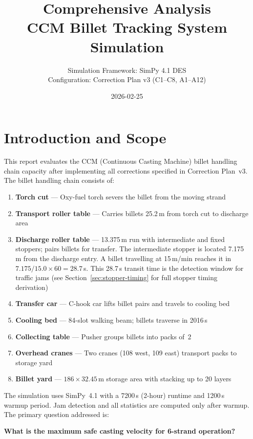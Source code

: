 \documentclass[11pt,a4paper]{article}
\title{\textbf{Comprehensive Analysis} \\ CCM Billet Tracking System Simulation}
\author{Simulation Framework: SimPy 4.1 DES \\ Configuration: Correction Plan v3 (C1--C8, A1--A12)}
\date{2026-02-25}
\begin{document}
\maketitle
\tableofcontents
\newpage

\section{Introduction and Scope}
\label{sec:introduction}

This report evaluates the CCM (Continuous Casting Machine) billet handling chain capacity after implementing all corrections specified in Correction Plan~v3. The billet handling chain consists of:

\begin{enumerate}
    \item \textbf{Torch cut} --- Oxy-fuel torch severs the billet from the moving strand
    \item \textbf{Transport roller table} --- Carries billets 25.2\,m from torch cut to discharge area
    \item \textbf{Discharge roller table} --- 13.375\,m run with intermediate and fixed stoppers; pairs billets for transfer. The intermediate stopper is located 7.175\,m from the discharge entry. A billet travelling at 15\,m/min reaches it in $7.175 / 15.0 \times 60 = 28.7$\,s. This 28.7\,s transit time is the detection window for traffic jams (see Section~\ref{sec:stopper-timing} for full stopper timing derivation)
    \item \textbf{Transfer car} --- C-hook car lifts billet pairs and travels to cooling bed
    \item \textbf{Cooling bed} --- 84-slot walking beam; billets traverse in 2016\,s
    \item \textbf{Collecting table} --- Pusher groups billets into packs of~2
    \item \textbf{Overhead cranes} --- Two cranes (108 west, 109 east) transport packs to storage yard
    \item \textbf{Billet yard} --- $186 \times 32.45$\,m storage area with stacking up to 20 layers
\end{enumerate}

The simulation uses SimPy~4.1 with a 7200\,s (2-hour) runtime and 1200\,s warmup period. Jam detection and all statistics are computed only after warmup. The primary question addressed is:

\begin{center}
\textbf{What is the maximum safe casting velocity for 6-strand operation?}
\end{center}
\end{document}
